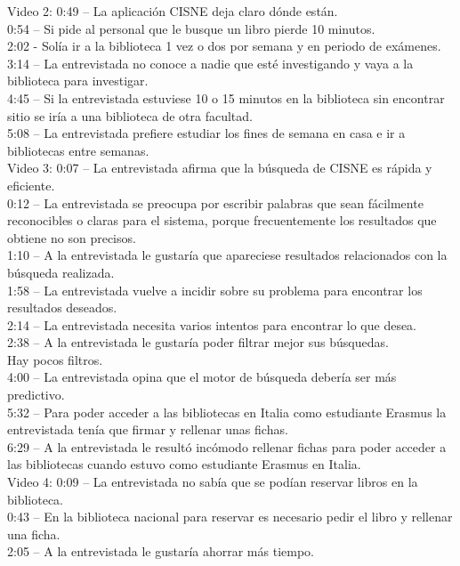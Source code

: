 \documentclass[12pt]{article}
\begin{document}
Video 2:  
0:49 – La aplicación CISNE deja claro dónde están.\\ 
0:54 – Si pide al personal que le busque un libro pierde 10 minutos.\\
2:02 - Solía ir a la biblioteca 1 vez o dos por semana y en periodo de exámenes.\\ 
3:14 – La entrevistada no conoce a nadie que esté investigando y vaya a la biblioteca para investigar.\\ 
4:45 – Si la entrevistada estuviese 10 o 15 minutos en la biblioteca sin encontrar sitio se iría a una biblioteca de otra facultad.\\ 
5:08 – La entrevistada prefiere estudiar los fines de semana en casa e ir a bibliotecas entre semanas.\\ 
Video 3:  
0:07 – La entrevistada afirma que la búsqueda de CISNE es rápida y eficiente.\\ 
0:12 – La entrevistada se preocupa por escribir palabras que sean fácilmente reconocibles o claras para el sistema, porque frecuentemente los resultados que obtiene no son precisos.\\ 
1:10 – A la entrevistada le gustaría que apareciese resultados relacionados con la búsqueda realizada.\\ 
1:58 – La entrevistada vuelve a incidir sobre su problema para encontrar los resultados deseados.\\ 
2:14 – La entrevistada necesita varios intentos para encontrar lo que desea.\\ 
2:38 – A la entrevistada le gustaría poder filtrar mejor sus búsquedas.\\ Hay pocos filtros.\\ 
4:00 – La entrevistada opina que el motor de búsqueda debería ser más predictivo.\\ 
5:32 – Para poder acceder a las bibliotecas en Italia como estudiante Erasmus la entrevistada tenía que firmar y rellenar unas fichas.\\
6:29 – A la entrevistada le resultó incómodo rellenar fichas para poder acceder a las bibliotecas cuando estuvo como estudiante Erasmus en Italia.\\
Video 4: 
0:09 – La entrevistada no sabía que se podían reservar libros en la biblioteca.\\ 
0:43 – En la biblioteca nacional para reservar es necesario pedir el libro y rellenar una ficha.\\ 
2:05 – A la entrevistada le gustaría ahorrar más tiempo.\\ 
\end{document}
